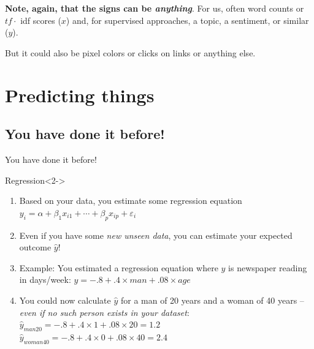\documentclass[handout]{beamer}
\begin{document}
\begin{frame}[plain]
\textbf{Note, again, that the  signs can be \emph{anything}}.
For us, often word counts or $tf\cdot$ idf scores ($x$) and, for supervised approaches, a topic, a sentiment, or similar ($y$). 

But it could also be pixel colors or clicks on links or anything else.
\begin{table}[]
\end{table}
\end{frame}


\section{Predicting things}




\subsection{You have done it before!}
\begin{frame}{You have done it before!}
\begin{block}{Regression}<2->
	\begin{enumerate}
		\item<3-> Based on your data, you estimate some regression equation 	$y_i = \alpha + \beta_1 x_{i1} + \cdots + \beta_p x_{ip} + \varepsilon_i$
		\item<4-> Even if you have some \emph{new unseen data}, you can estimate your expected outcome $\hat{y}$!
		\item<5-> Example: You estimated a regression equation where $y$ is newspaper reading in days/week: $y = -.8 + .4 \times man + .08 \times age$
		\item<6-> You could now calculate $\hat{y}$ for a man of 20 years and a woman of 40 years -- \emph{even if no such person exists in your dataset}: \\
		$\hat{y}_{man20} = -.8 + .4 \times 1 + .08 \times 20 = 1.2$ \\
		$\hat{y}_{woman40} = -.8 + .4 \times 0 + .08 \times 40 = 2.4$
	\end{enumerate}
\end{block}	

\end{frame}
\end{document}
